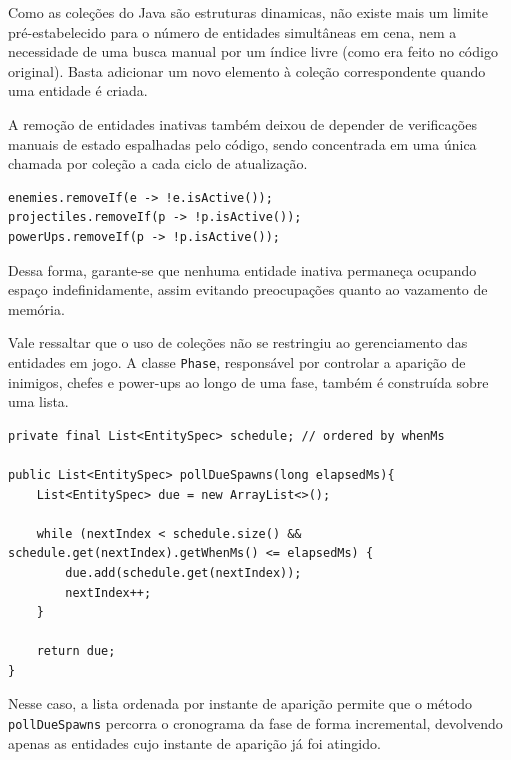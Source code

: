 Como as coleções do Java são estruturas dinamicas, não existe mais um limite
pré-estabelecido para o número de entidades simultâneas em cena, nem a necessidade
de uma busca manual por um índice livre (como era feito no código original). Basta adicionar um novo elemento à
coleção correspondente quando uma entidade é criada.

A remoção de entidades inativas também deixou de depender de verificações
manuais de estado espalhadas pelo código, sendo concentrada em uma única
chamada por coleção a cada ciclo de atualização.

\begin{lstlisting}[caption={Remoção de entidades inativas via \texttt{removeIf} (Game.java)}]
enemies.removeIf(e -> !e.isActive());
projectiles.removeIf(p -> !p.isActive());
powerUps.removeIf(p -> !p.isActive());
\end{lstlisting}

Dessa forma, garante-se que nenhuma entidade inativa permaneça ocupando espaço
indefinidamente, assim evitando preocupações quanto ao vazamento de memória.

Vale ressaltar que o uso de coleções não se restringiu ao gerenciamento das entidades em jogo.
A classe \texttt{Phase}, responsável por controlar a aparição de inimigos,
chefes e power-ups ao longo de uma fase, também é construída sobre uma lista.

\begin{lstlisting}[caption={Utilização de lista para agendar as aparições da fase (Phase.java)}]
private final List<EntitySpec> schedule; // ordered by whenMs

public List<EntitySpec> pollDueSpawns(long elapsedMs){
    List<EntitySpec> due = new ArrayList<>();

    while (nextIndex < schedule.size() && schedule.get(nextIndex).getWhenMs() <= elapsedMs) {
        due.add(schedule.get(nextIndex));
        nextIndex++;
    }

    return due;
}
\end{lstlisting}

Nesse caso, a lista ordenada por instante de aparição permite que o método
\texttt{pollDueSpawns} percorra o cronograma da fase de forma incremental,
devolvendo apenas as entidades cujo instante de aparição já foi atingido.

